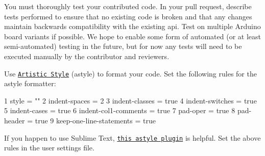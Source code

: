 You must thoroughly test your contributed code. In your pull request, describe tests performed to ensure that no existing code is broken and that any changes maintain backwards compatibility with the existing api. Test on multiple Arduino board variants if possible. We hope to enable some form of automated (or at least semi-\/automated) testing in the future, but for now any tests will need to be executed manually by the contributor and reviewers.

Use \href{http://astyle.sourceforge.net/}{\tt Artistic Style} (astyle) to format your code. Set the following rules for the astyle formatter\+:


\begin{DoxyCode}
1 style = ""
2 indent-spaces = 2
3 indent-classes = true
4 indent-switches = true
5 indent-cases = true
6 indent-col1-comments = true
7 pad-oper = true
8 pad-header = true
9 keep-one-line-statements = true
\end{DoxyCode}


If you happen to use Sublime Text, \href{https://github.com/timonwong/SublimeAStyleFormatter}{\tt this astyle plugin} is helpful. Set the above rules in the user settings file. 